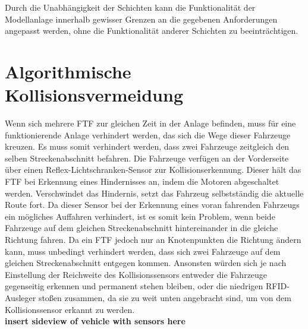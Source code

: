 		Durch die Unabhängigkeit der Schichten kann die Funktionalität der Modellanlage innerhalb gewisser Grenzen an die gegebenen Anforderungen angepasst werden, ohne die Funktionalität anderer Schichten zu beeinträchtigen.

\section{Algorithmische Kollisionsvermeidung}
	\label{Kollisionsvermeidung}
	Wenn sich mehrere \ac{FTF} zur gleichen Zeit in der Anlage befinden, muss für eine funktionierende Anlage verhindert werden, das sich die Wege dieser Fahrzeuge kreuzen. Es muss somit verhindert werden, dass zwei Fahrzeuge zeitgleich den selben Streckenabschnitt befahren.  Die Fahrzeuge verfügen an der Vorderseite über einen Reflex-Lichtschranken-Sensor zur Kollisionserkennung. Dieser hält das \ac{FTF} bei Erkennung eines Hindernisses an, indem die Motoren abgeschaltet werden. Verschwindet das Hindernis, setzt das Fahrzeug selbstständig die aktuelle Route fort. Da dieser Sensor bei der Erkennung eines voran fahrenden Fahrzeugs ein mögliches Auffahren verhindert, ist es somit kein Problem, wenn beide Fahrzeuge auf dem gleichen Streckenabschnitt hintereinander in die gleiche Richtung fahren. Da ein \ac{FTF} jedoch nur an Knotenpunkten die Richtung ändern kann, muss unbedingt verhindert werden, dass sich zwei Fahrzeuge auf dem gleichen Streckenabschnitt entgegen kommen. Ansonsten würden sich je nach Einstellung der Reichweite des Kollisionssensors entweder die Fahrzeuge gegenseitig erkennen und permanent stehen bleiben, oder die niedrigen \ac{RFID}-Ausleger stoßen zusammen, da sie zu weit unten angebracht sind, um von dem Kollisionssensor erkannt zu werden.\\ \textbf{insert sideview of vehicle with sensors here}
	
